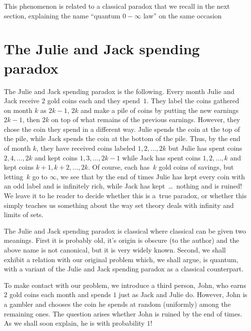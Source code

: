 \documentclass[pdftex]{sigma}%
\begin{document}
This phenomenon is related to a classical paradox that we recall in the next section, explaining the name ``quantum $0-\infty$ law'' on the same occasion

\section{The Julie and Jack spending paradox} \label{sec:jjjparadox}

The Julie and Jack spending paradox is the following. Every month Julie and Jack receive $2$ gold coins each and they spend~$1$. They label the coins gathered on month $k$ as $2k-1$, $2k$ and make a pile of coins by putting the new earnings $2k-1$, then $2k$ on top of what remains of the previous earnings. However, they chose the coin they spend in a different way. Julie spends the coin at the top of the pile, while Jack spends the coin at the bottom of the pile. Thus, by the end of month $k$, they have received coins labeled $1,2,\dots,2k$ but Julie has spent coins $2,4,\dots,2k$ and kept coins $1,3,\dots,2k-1$ while Jack has spent coins $1,2,\dots,k$ and kept coins $k+1,k+2,\dots,2k$. Of course, each has~$k$ gold coins of savings, but letting~$k$ go to $\infty$, we see that by the end of times Julie has kept every coin with an odd label and is infinitely rich, while Jack has kept~\dots\ nothing and is ruined! We leave it to he reader to decide whether this is a~true paradox, or whether this simply teaches us something about the way set theory deals with infinity and limits of sets.

The Julie and Jack spending paradox is classical where classical can be given two meanings. First it is probably old, it's origin is obscure (to the author) and the above name is not canonical, but it is very widely known. Second, we shall exhibit a relation with our original problem which, we shall argue, is quantum, with a variant of the Julie and Jack spending paradox as a classical counterpart.

To make contact with our problem, we introduce a third person, John, who earns $2$ gold coins each month and spends $1$ just as Jack and Julie do. However, John is a gambler and chooses the coin he spends at random (uniformly) among the remaining ones. The question arises whether John is ruined by the end of times. As we shall soon explain, he is with probability $1$!
\end{document}
